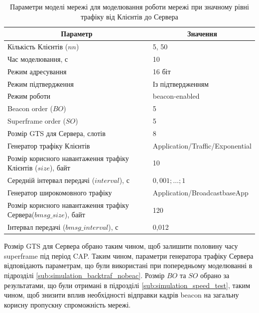 \documentclass[a4paper,ukrainian,utf8,nocolumnsxix,nocolumnxxxii,nocolumnxxxi,floatsection,equationsection]{eskdtext}
\newcommand{\bem}[0]{beacon-enabled\xspace}
\newcommand{\col}[2]{\multicolumn{1}{#1}{#2}}
\begin{document}
\begin{table}[htbp]
\caption{Параметри моделі мережі для моделювання роботи мережі при значному рівні трафіку від Клієнтів до Сервера}
\centering
\begin{tabu} to 
	\hline
	\col{|c|}{Параметр}                         & \col{c|}{Значення}              \\ \hline
	Кількість Клієнтів ($nn$)                    & 5, 50                           \\ \hline
	Час моделювання, с                             & 10                              \\ \hline
	Режим адресування                      & 16 біт                          \\ \hline
	Режим підтвердження                          & Із підтвердженням               \\ \hline
	Режим роботи                                 & \bem                     \\ \hline
	Beacon order ($BO$)                                           & 5                               \\ \hline
	Superframe order ($SO$)                                           & 5                               \\ \hline
	Розмір GTS для Сервера, слотів                       & 8                               \\ \hline
	Генератор трафіку Клієнтів                   & Application/Traffic/Exponential \\ \hline
	Розмір корисного навантаження трафіку Клієнтів ($size$), байт & 10                              \\ \hline
	Середній інтервал передачі ($interval$), с   & $0,001;\dots;1$                 \\ \hline
	Генератор широкомовного трафіку              & Application/BroadcastbaseApp    \\ \hline
	Розмір корисного навантаження трафіку Сервера($bmsg\_size$), байт         & 120                             \\ \hline
	Інтервал передачі ($bmsg\_interval$), с      & 0,012                           \\ \hline
\end{tabu}
\label{tbl:simulation_backtraf_beac_brd}
\end{table}

Розмір GTS для Сервера обрано таким чином, щоб залишити половину часу superframe під період CAP. Таким чином, параметри генератора  трафіку Сервера  відповідають параметрам, що були використані при попередньому моделюванні в підрозділі \ref{sub:simulation_backtraf_nobeac}. Розмір $BO$ та $SO$ обрано за результатами, що були отримані в підрозділі \ref{sub:simulation_speed_test}, таким чином, щоб знизити вплив необхідності відправки кадрів beacon на загальну корисну пропускну спроможність мережі.
\end{document}
